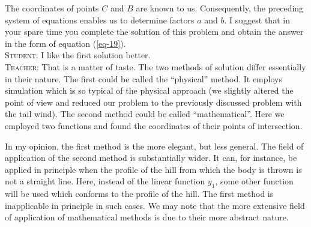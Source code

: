 \documentclass[a4paper,sfsidenotes]{tufte-book}
\begin{document}
The coordinates of points $C$ and $B$ are known to us. Consequently, the preceding system of equations enables us to determine factors $a$ and $b$. I suggest that in your spare time you complete
the solution of this problem and obtain the answer in the form of equation (\ref{eq-19}).
\\
\textsc{Student:} I like the first solution better.
\\
\textsc{Teacher:} That is a matter of taste. The two methods of solution differ essentially in their nature. The first could be called the ``physical'' method. It employs simulation which is so typical of the physical approach (we slightly altered the point of view and reduced our problem to the previously
discussed problem with the tail wind). The second method could be called ``mathematical''. Here we employed two functions and found the coordinates of their points of intersection.

In my opinion, the first method is the more elegant, but less general. The field of application of the second method is substantially wider. It can, for instance, be applied in principle when the profile of the hill from which the body is thrown is not a straight line. Here, instead of the linear function $y_{1}$, some other function will be used which conforms to the profile of the hill. The first method is inapplicable in principle in such cases. We may note that the more extensive field of application of mathematical methods is due to their more abstract nature.
\end{document}
